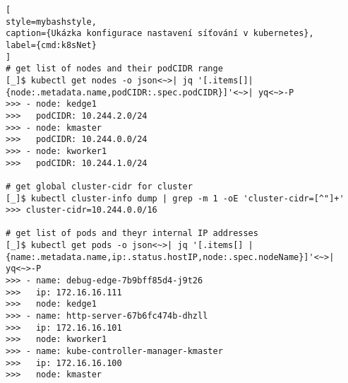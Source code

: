 \begin{lstfloat}
\begin{lstlisting}[
style=mybashstyle,
caption={Ukázka konfigurace nastavení síťování v kubernetes},
label={cmd:k8sNet}
]
# get list of nodes and their podCIDR range
[_]$ kubectl get nodes -o json<~>| jq '[.items[]|{node:.metadata.name,podCIDR:.spec.podCIDR}]'<~>| yq<~>-P
>>> - node: kedge1
>>>   podCIDR: 10.244.2.0/24
>>> - node: kmaster
>>>   podCIDR: 10.244.0.0/24
>>> - node: kworker1
>>>   podCIDR: 10.244.1.0/24

# get global cluster-cidr for cluster
[_]$ kubectl cluster-info dump | grep -m 1 -oE 'cluster-cidr=[^"]+'
>>> cluster-cidr=10.244.0.0/16

# get list of pods and theyr internal IP addresses  
[_]$ kubectl get pods -o json<~>| jq '[.items[] | {name:.metadata.name,ip:.status.hostIP,node:.spec.nodeName}]'<~>| yq<~>-P
>>> - name: debug-edge-7b9bff85d4-j9t26
>>>   ip: 172.16.16.111
>>>   node: kedge1
>>> - name: http-server-67b6fc474b-dhzll
>>>   ip: 172.16.16.101
>>>   node: kworker1
>>> - name: kube-controller-manager-kmaster
>>>   ip: 172.16.16.100
>>>   node: kmaster
\end{lstlisting}
\end{lstfloat}
